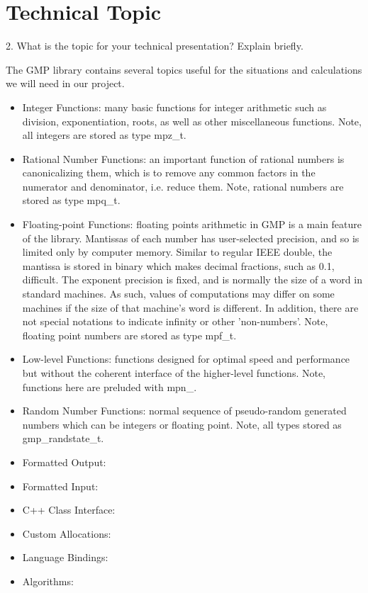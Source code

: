 \section{Technical Topic}

2. What is the topic for your technical presentation? Explain briefly.

The GMP library contains several topics useful for the situations and calculations we will need in our project.

\begin{itemize}

  \item Integer Functions: many basic functions for integer arithmetic such as division, exponentiation, roots, as well as other
  miscellaneous functions. Note, all integers are stored as type mpz_t.
  
  \item Rational Number Functions: an important function of rational numbers is canonicalizing them, which is to remove any common 
  factors in the numerator and denominator, i.e. reduce them. Note, rational numbers are stored as type mpq_t. 
  
  \item Floating-point Functions: floating points arithmetic in GMP is a main feature of the library. Mantissas of each number 
  has user-selected precision, and so is limited only by computer memory. Similar to regular IEEE double, the mantissa is stored in binary   which makes decimal fractions, such as 0.1, difficult. The exponent precision is fixed, and is normally the size of a word in standard     machines. As such, values of computations may differ on some machines if the size of that machine's word is different. In addition,       there are not special notations to indicate infinity or other 'non-numbers'. Note, floating point numbers are stored as type mpf_t.
  
  \item Low-level Functions: functions designed for optimal speed and performance but without the coherent interface of the higher-level
  functions. Note, functions here are preluded with mpn_.
  
  \item Random Number Functions: normal sequence of pseudo-random generated numbers which can be integers or floating point. Note, all
  types stored as gmp_randstate_t.
  
  \item Formatted Output:
  \item Formatted Input:
  \item C++ Class Interface:
  \item Custom Allocations:
  \item Language Bindings:
  \item Algorithms:



\end{itemize}

